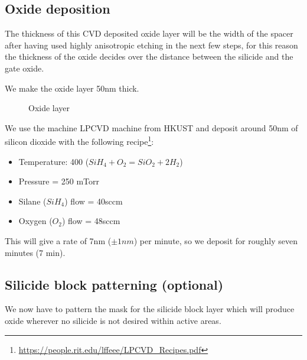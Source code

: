 \subsection{Oxide deposition}

The thickness of this CVD deposited oxide layer will be the width of the spacer after having used highly anisotropic etching in the next few steps, for this reason the thickness of the oxide decides over the distance between the silicide and the gate oxide.

We make the oxide layer 50nm thick.

\begin{figure}[H]
	\centering
	\begin{tikzpicture}[node distance = 3cm, auto, thick,scale=\CrossSectionOnly, every node/.style={transform shape}]
		
	\end{tikzpicture}
	\begin{tikzpicture}[node distance = 3cm, auto, thick,scale=\CrossSectionOnly, every node/.style={transform shape}]
		
	\end{tikzpicture}
	\caption{Oxide layer}
\end{figure}

We use the machine LPCVD machine from HKUST and deposit around 50nm of silicon dioxide with the following recipe\footnote{\url{https://people.rit.edu/lffeee/LPCVD_Recipes.pdf}}:
\begin{itemize}
	\item Temperature: 400 \degreesC  ($Si H_4 + O_2 = Si O_2 + 2 H_2$)
	\item Pressure = 250 mTorr
	\item Silane ($Si H_4$) flow = 40sccm
	\item Oxygen ($O_2$) flow = 48sccm
\end{itemize}

This will give a rate of 7nm ($\pm 1nm$) per minute, so we deposit for roughly seven minutes (7 min).

\subsection{Silicide block patterning (optional)}

We now have to pattern the mask for the silicide block layer which will produce oxide wherever no silicide is not desired within active areas.

